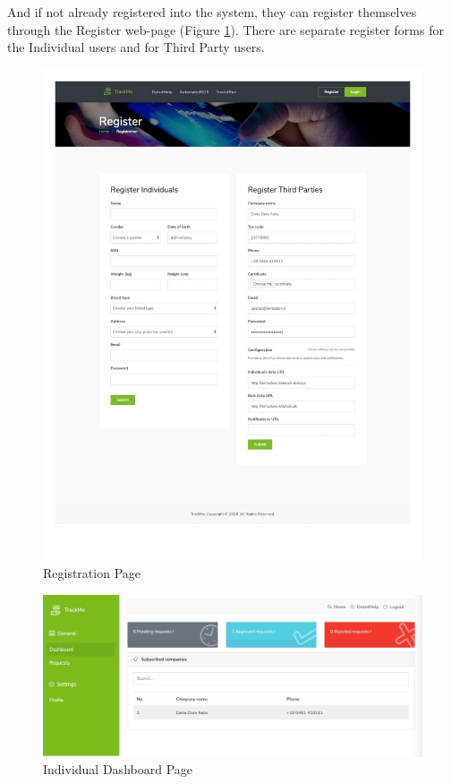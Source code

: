 \documentclass[a4paper, hidelinks, 12pt]{report}
\begin{document}
	 And if not already registered into the system, they can register themselves through the Register web-page (Figure \ref{fig:Registration}). There are separate register forms for the Individual users and for Third Party users.
	 \begin{figure}[H]
		\centering
		\includegraphics[scale=0.45]{UI/UI/10.jpeg}
		\caption[UI: Registration Page]{Registration Page}
		\label{fig:Registration}
	\end{figure}
	
	\begin{figure}[H]
		\centering
		\includegraphics[width=1\textwidth]{UI/UI/2.jpeg}
		\caption[UI: Individual Dashboard Page]{Individual Dashboard Page}
		\label{fig:Dashboard for individuals}
	\end{figure}
\end{document}

